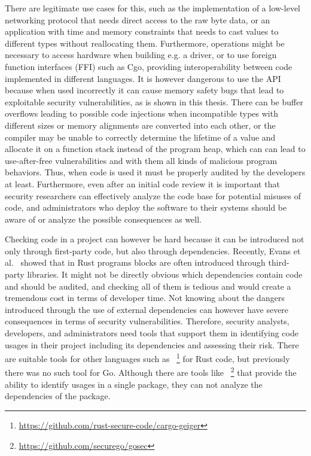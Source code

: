 There are legitimate use cases for this, such as the implementation of a low-level networking protocol that needs
direct access to the raw byte data, or an application with time and memory constraints that needs to cast values to
different types without reallocating them.
Furthermore, \unsafe{} operations might be necessary to access hardware when building e.g. a driver, or to use
foreign function interfaces (\acrshort{FFI}) such as Cgo, providing interoperability between code implemented in
different languages.
It is however dangerous to use the \unsafe{} \acrshort{API} because when used incorrectly it can cause memory safety
bugs that lead to exploitable security vulnerabilities, as is shown in this thesis.
There can be buffer overflows leading to possible code injections when incompatible types with different sizes or
memory alignments are converted into each other, or the compiler may be unable to correctly determine the lifetime of
a value and allocate it on a function stack instead of the program heap, which can can lead to use-after-free
vulnerabilities and with them all kinds of malicious program behaviors.
Thus, when \unsafe{} code is used it must be properly audited by the developers at least.
Furthermore, even after an initial code review it is important that security researchers can effectively analyze the
code base for potential misuses of \unsafe{} code, and administrators who deploy the software to their systems should
be aware of or analyze the possible consequences as well.

Checking \unsafe{} code in a project can however be hard because it can be introduced not only through first-party
code, but also through dependencies.
Recently, Evans et al.~\cite{evans2020} showed that in Rust programs \unsafe{} blocks are often introduced through
third-party libraries.
It might not be directly obvious which dependencies contain \unsafe{} code and should be audited, and checking all of
them is tedious and would create a tremendous cost in terms of developer time.
Not knowing about the dangers introduced through the use of external dependencies can however have severe consequences
in terms of security vulnerabilities.
Therefore, security analysts, developers, and administrators need tools that support them in identifying \unsafe{}
code usages in their project including its dependencies and assessing their risk.
There are suitable tools for other languages such as
\toolCargoGeiger{}~\footnote{\url{https://github.com/rust-secure-code/cargo-geiger}} for Rust code, but previously there
was no such tool for Go.
Although there are tools like \toolGosec{}~\footnote{\url{https://github.com/securego/gosec}} that provide the ability
to identify \unsafe{} usages in a single package, they can not analyze the dependencies of the package.

